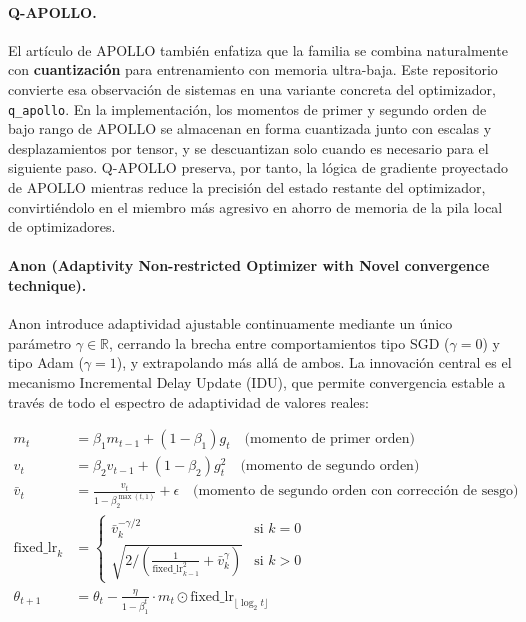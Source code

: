 \paragraph{Q-APOLLO.}
El artículo de APOLLO también enfatiza que la familia se combina naturalmente con \textbf{cuantización} para entrenamiento con memoria ultra-baja. Este repositorio convierte esa observación de sistemas en una variante concreta del optimizador, \texttt{q\_apollo}. En la implementación, los momentos de primer y segundo orden de bajo rango de APOLLO se almacenan en forma cuantizada junto con escalas y desplazamientos por tensor, y se descuantizan solo cuando es necesario para el siguiente paso. Q-APOLLO preserva, por tanto, la lógica de gradiente proyectado de APOLLO mientras reduce la precisión del estado restante del optimizador, convirtiéndolo en el miembro más agresivo en ahorro de memoria de la pila local de optimizadores.

\paragraph{Anon (Adaptivity Non-restricted Optimizer with Novel convergence technique).}
Anon \citep{anon2026anon} introduce adaptividad ajustable continuamente mediante un único parámetro $\gamma \in \mathbb{R}$, cerrando la brecha entre comportamientos tipo SGD ($\gamma=0$) y tipo Adam ($\gamma=1$), y extrapolando más allá de ambos. La innovación central es el mecanismo Incremental Delay Update (IDU), que permite convergencia estable a través de todo el espectro de adaptividad de valores reales:

\begin{align}
m_t &= \beta_1 m_{t-1} + (1-\beta_1) g_t \quad\text{(momento de primer orden)}\\
v_t &= \beta_2 v_{t-1} + (1-\beta_2) g_t^2 \quad\text{(momento de segundo orden)}\\
\bar{v}_t &= \frac{v_t}{1-\beta_2^{\max(t,1)}} + \epsilon \quad\text{(momento de segundo orden con corrección de sesgo)}\\
\text{fixed\_lr}_k &= \begin{cases}
\bar{v}_k^{-\gamma/2} & \text{si } k = 0 \\
\sqrt{2 / \left(\frac{1}{\text{fixed\_lr}_{k-1}^2} + \bar{v}_k^\gamma\right)} & \text{si } k > 0
\end{cases}\\
\theta_{t+1} &= \theta_t - \frac{\eta}{1-\beta_1^t} \cdot m_t \odot \text{fixed\_lr}_{\lfloor\log_2 t\rfloor}
\end{align}

